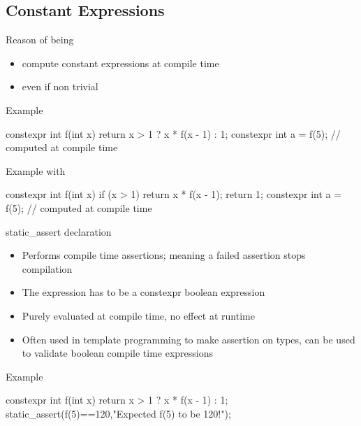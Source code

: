 \subsection[cstexpr]{Constant Expressions}

\begin{frame}[fragile]
  \begin{block}{Reason of being}
    \begin{itemize}
    \item compute constant expressions at compile time
    \item even if non trivial
    \end{itemize}
  \end{block}
  \pause
  \begin{exampleblock}{Example}
    \begin{cppcode*}{}
      constexpr int f(int x) {
        return x > 1 ? x * f(x - 1) : 1;
      }
      constexpr int a = f(5); // computed at compile time
    \end{cppcode*}
  \end{exampleblock}
  \pause
  \begin{exampleblock}{Example with }
    \begin{cppcode*}{}
      constexpr int f(int x) {
        if (x > 1) return x * f(x - 1);
        return 1;
      }
      constexpr int a = f(5); // computed at compile time
    \end{cppcode*}
  \end{exampleblock}
\end{frame}

\begin{frame}[fragile]
  \begin{block}{static\_assert declaration}
    \begin{itemize}
    \item Performs compile time assertions; meaning a failed assertion stops compilation
    \item The expression has to be a constexpr boolean expression
    \item Purely evaluated at compile time, no effect at runtime
    \item Often used in template programming to make assertion on types, can be
      used to validate boolean compile time expressions
    \end{itemize}
  \end{block}
  \pause
  \begin{exampleblock}{Example}
    \begin{cppcode*}{}
      constexpr int f(int x) {
        return x > 1 ? x * f(x - 1) : 1;
      }
      static_assert(f(5)==120,"Expected f(5) to be 120!");
    \end{cppcode*}
  \end{exampleblock}
\end{frame}


